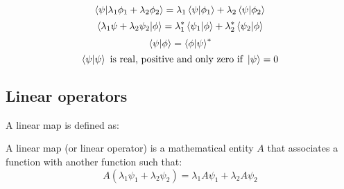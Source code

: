 \begin{equation}
    \braket{\psi|\lambda_1\phi_1+\lambda_2\phi_2} = \lambda_1\braket{\psi|\phi_1} + \lambda_2\braket{\psi|\phi_2}
\end{equation}
\begin{equation}
    \braket{\lambda_1\psi+\lambda_2\psi_2|\phi} = \lambda_1^*\braket{\psi_1|\phi} + \lambda_2^*\braket{\psi_2|\phi}
\end{equation}
\begin{equation}
    \braket{\psi|\phi} = \braket{\phi|\psi}^*
\end{equation}
\begin{equation}
    \braket{\psi|\psi}\text{ is real, positive and only zero if }\ket{\psi} = 0
\end{equation}


\subsection{Linear operators} \label{sec:lin-ops}

A linear map is defined as:

\begin{definition} \label{linear_map}
    A linear map (or linear operator) is a mathematical entity $A$ that associates a function with another function such that:
    \begin{equation}
        A (\lambda_1\psi_1 + \lambda_2\psi_2) = \lambda_1 A\psi_1 + \lambda_2 A\psi_2
    \end{equation}
\end{definition}


